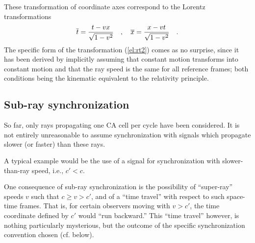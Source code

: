 \documentclass[pra,amsfonts, twocolumn]{revtex4}
\begin{document}
These transformation of coordinate axes correspond to the
Lorentz transformations
\begin{equation}
{\overline t} =
{t-vx\over \sqrt{1-v^2}}\quad , \quad
{\overline x} =
{x-vt\over \sqrt{1-v^2}}\quad .\label{el:rt2}
\end{equation}
The specific form of the transformation (\ref{el:rt2})
comes as no surprise, since it has been derived by implicitly assuming
that constant
motion transforms into constant motion and that the ray speed is the
same for all reference frames; both conditions being the kinematic
equivalent to the relativity principle.

\subsection{Sub-ray synchronization}

So far, only rays propagating one CA cell per cycle have been
considered.
It is not entirely unreasonable to assume
synchronization with signals which propagate slower (or faster) than
these rays.

A
typical example would be the use of a signal for synchronization with
slower-than-ray speed, i.e., $c'<c$.

One consequence of sub-ray synchronization is the possibility of
``super-ray'' speeds $v$ such that
$c\ge v>c'$, and of a
``time
travel'' with respect to such space-time frames. That is, for certain
observers moving with
$v>c'$, the time coordinate defined by $c'$ would ``run backward.''
This ``time travel'' however, is nothing particularly mysterious, but
the
outcome of the specific synchronization convention chosen (cf. below).
\end{document}
